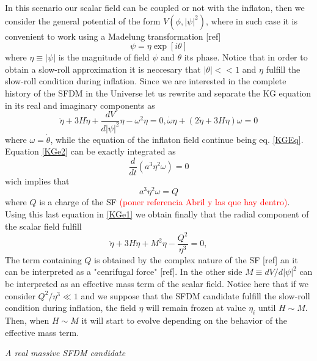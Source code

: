 \documentclass[twocolumn,           %
               showpacs,            %
               preprintnumbers,     %
               aps,                 %
               prl,          	    %
               letterpaper,             %
               superscriptaddress,      %
               nofootinbib,         %
               tightenlines,        %
               floats,floatfix      %
               ,usenatbib,
               ]{revtex4-1}
\begin{document}
In this scenario our scalar field can be coupled or not with the inflaton, then we consider the general potential of the form $V(\phi,|\psi|^2)$, where in such case it is convenient to work using a Madelung transformation [ref]
\begin{equation}
\psi = \eta \exp[i\theta]
\end{equation}
where $\eta\equiv |\psi|$ is the magnitude of field $\psi$ and $\theta$ its phase. Notice that in order to obtain a slow-roll approximation it is neccesary that $|\theta|<<1$ and $\eta$ fulfill the slow-roll condition during inflation. Since we are interested in the complete history of the SFDM in the Universe let us rewrite and separate the KG equation in its real and imaginary components as
\begin{subequations}\label{KESFDM}
\begin{equation}\label{KGe1}
\ddot\eta+3H\dot\eta+\frac{dV}{d|\psi|^2}\eta-\omega^2\eta= 0,
\end{equation}
\begin{equation}\label{KGe2}
\dot\omega \eta + (2\dot\eta+3H\eta)\omega=0
\end{equation}
\end{subequations}
where $\omega = \dot \theta$, while the equation of the inflaton field continue being eq. \eqref{KGEq}. Equation \eqref{KGe2} can be exactly integrated as
\begin{equation}
\frac{d}{dt}\left(a^3\eta^2\omega\right)=0
\end{equation}
wich implies that 
\begin{equation}
a^3\eta^2\omega=Q
\end{equation}
where $Q$ is a charge of the SF \textcolor{red}{(poner referencia Abril y las que hay dentro)}. Using this last equation in \eqref{KGe1} we obtain finally
that the radial component of the scalar field fulfill
\begin{equation}\label{KGe3}
\ddot\eta+3H\dot\eta+M^2\eta-\frac{Q^2}{\eta^3}= 0,
\end{equation}
The term containing $Q$ is obtained by the complex nature of the SF [ref] an it can be interpreted as a "cenrifugal force" [ref]. In the other side $M\equiv dV/d|\psi|^2$ can be interpreted as an effective mass term of the scalar field. Notice here that if we consider $Q^2/\eta^3\ll 1$ and we suppose that the SFDM candidate fulfill the slow-roll condition during inflation, the field $\eta$ will remain frozen at value $\eta_i$ until $H\sim M$. Then, when $H\sim M$ it will start to evolve depending on the behavior of the effective mass term.
\begin{center}
\textit{A real massive SFDM candidate}
\end{center}
\end{document}
